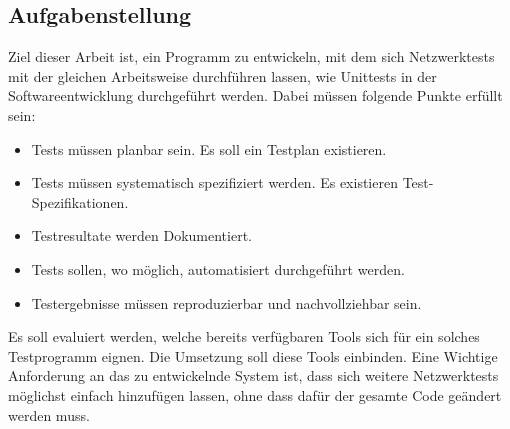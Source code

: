 \documentclass[]{subfiles}
\begin{document}
    \subsection{Aufgabenstellung}
    Ziel dieser Arbeit ist, ein Programm zu entwickeln, mit dem sich Netzwerktests mit 
    der gleichen Arbeitsweise durchführen lassen, wie Unittests in der Softwareentwicklung
    durchgeführt werden. Dabei müssen folgende Punkte erfüllt sein:
    \begin{itemize}
        \item Tests müssen planbar sein. Es soll ein Testplan existieren.
        \item Tests müssen systematisch spezifiziert werden. Es existieren Test-Spezifikationen.
        \item Testresultate werden Dokumentiert.
        \item Tests sollen, wo möglich, automatisiert durchgeführt werden.
        \item Testergebnisse müssen reproduzierbar und nachvollziehbar sein.
    \end{itemize}
    Es soll evaluiert werden, welche bereits verfügbaren Tools sich für ein solches Testprogramm
    eignen. Die Umsetzung soll diese Tools einbinden.
    Eine Wichtige Anforderung an das zu entwickelnde System ist, dass sich weitere 
    Netzwerktests möglichst einfach hinzufügen lassen, ohne dass dafür der gesamte Code
    geändert werden muss. 
    
\end{document}
